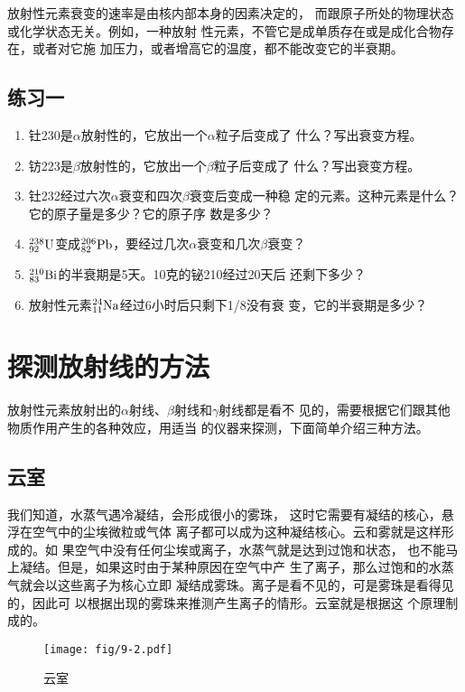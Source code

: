 放射性元素衰变的速率是由核内部本身的因素决定的，
而跟原子所处的物理状态或化学状态无关。例如，一种放射
性元素，不管它是成单质存在或是成化合物存在，或者对它施
加压力，或者增高它的温度，都不能改变它的半衰期。

\subsection*{练习一}
\begin{enumerate}
    \item 钍230是$\alpha$放射性的，它放出一个$\alpha$粒子后变成了
什么？写出衰变方程。
\item 钫223是$\beta$放射性的，它放出一个$\beta$粒子后变成了
什么？写出衰变方程。
\item 钍232经过六次$\alpha$衰变和四次$\beta$衰变后变成一种稳
定的元素。这种元素是什么？它的原子量是多少？它的原子序
数是多少？
\item 
$\atom{U}{238}{92}$变成$\atom{Pb}{206}{82}$，要经过几次$\alpha$衰变和几次$\beta$衰变？
\item 
$\atom{Bi}{210}{83}$的半衰期是5天。10克的铋210经过20天后
还剩下多少？
\item 放射性元素$\atom{Na}{24}{11}$经过6小时后只剩下1/8没有衰
变，它的半衰期是多少？
\end{enumerate}

\section{探测放射线的方法}
放射性元素放射出的$\alpha$射线、$\beta$射线和$\gamma$射线都是看不
见的，需要根据它们跟其他物质作用产生的各种效应，用适当
的仪器来探测，下面简单介绍三种方法。

\subsection{云室}
我们知道，水蒸气遇冷凝结，会形成很小的雾珠，
这时它需要有凝结的核心，悬浮在空气中的尘埃微粒或气体
离子都可以成为这种凝结核心。云和雾就是这样形成的。如
果空气中没有任何尘埃或离子，水蒸气就是达到过饱和状态，
也不能马上凝结。但是，如果这时由于某种原因在空气中产
生了离子，那么过饱和的水蒸气就会以这些离子为核心立即
凝结成雾珠。离子是看不见的，可是雾珠是看得见的，因此可
以根据出现的雾珠来推测产生离子的情形。云室就是根据这
个原理制成的。

\begin{figure}[htp]
    \centering
    \texttt{[image: fig/9-2.pdf]}
    \caption{云室}
\end{figure}

